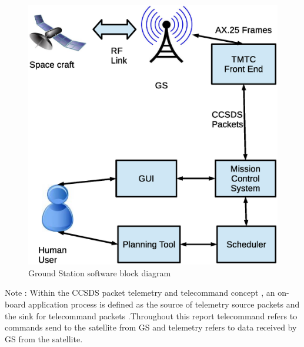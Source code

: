 \documentclass[BTech]{iitmdiss}
\begin{document}
\begin{figure}[H]

\includegraphics[scale = 0.7]{gs.eps}
\caption{Ground Station software block diagram}
\label{fig:gs}
\end{figure}
Note : Within the CCSDS packet telemetry and telecommand concept
, an on-board application process is defined as the source of telemetry source packets and the sink for telecommand packets \citep{ecss}.Throughout this report telecommand refers to commands send to the satellite from GS and telemetry refers to data received by GS from the satellite.
\end{document}
